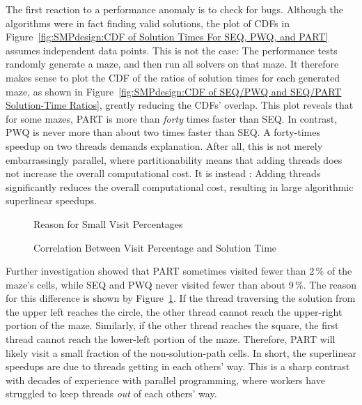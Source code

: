 The first reaction to a performance anomaly is to check for bugs.
Although the algorithms were in fact finding valid solutions, the
plot of CDFs in
Figure~\ref{fig:SMPdesign:CDF of Solution Times For SEQ, PWQ, and PART}
assumes independent data points.
This is not the case:  The performance tests randomly generate a maze,
and then run all solvers on that maze.
It therefore makes sense to plot the CDF of the ratios of
solution times for each generated maze,
as shown in
Figure~\ref{fig:SMPdesign:CDF of SEQ/PWQ and SEQ/PART Solution-Time Ratios},
greatly reducing the CDFs' overlap.
This plot reveals that for some mazes, PART
is more than \emph{forty} times faster than SEQ\@.
In contrast, PWQ is never more than about
two times faster than SEQ\@.
A forty-times speedup on two threads demands explanation.
After all, this is not merely embarrassingly parallel, where partitionability
means that adding threads does not increase the overall computational cost.
It is instead \emph{}: Adding threads
significantly reduces the overall computational cost, resulting in
large algorithmic superlinear speedups.

\begin{figure}
\centering
{}
\caption{Reason for Small Visit Percentages}
\label{fig:SMPdesign:Reason for Small Visit Percentages}
\end{figure}

\begin{figure}
\centering
{}
\caption{Correlation Between Visit Percentage and Solution Time}
\label{fig:SMPdesign:Correlation Between Visit Percentage and Solution Time}
\end{figure}

Further investigation showed that
PART sometimes visited fewer than 2\,\% of the maze's cells,
while SEQ and PWQ never visited fewer than about 9\,\%.
The reason for this difference is shown by
Figure~\ref{fig:SMPdesign:Reason for Small Visit Percentages}.
If the thread traversing the solution from the upper left reaches
the circle, the other thread cannot reach
the upper-right portion of the maze.
Similarly, if the other thread reaches the square,
the first thread cannot reach the lower-left
portion of the maze.
Therefore, PART will likely visit a small fraction
of the non-solution-path cells.
In short, the superlinear speedups are due to threads getting in each
others' way.
This is a sharp contrast with decades of experience with
parallel programming, where workers have struggled
to keep threads \emph{out} of each others' way.

